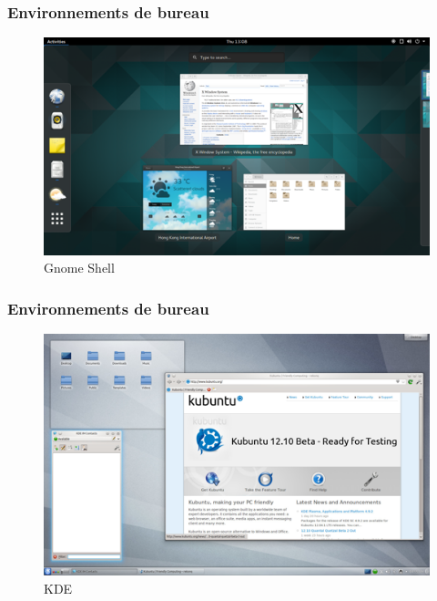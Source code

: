 \documentclass[aspectratio=169]{beamer}
\begin{document}
\begin{frame}
  \frametitle{Environnements de bureau}
  \begin{figure}[!h]
    \center
    \includegraphics[scale=0.245]
    {textures/images/unix/desktop_environment/gnome-shell.png}
    \caption{Gnome Shell}
  \end{figure}
\end{frame}

\begin{frame}
  \frametitle{Environnements de bureau}
  \begin{figure}[!h]
    \center
    \includegraphics[scale=0.25]
    {textures/images/unix/desktop_environment/kde.png}
    \caption{KDE}
  \end{figure}
\end{frame}
\end{document}
